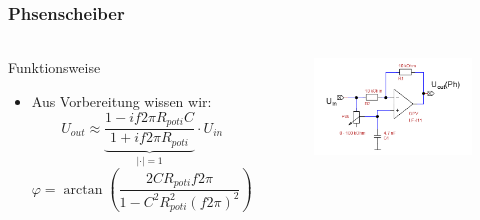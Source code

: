 \begin{frame}
\frametitle{Phsenscheiber}
\framesubtitle{}
    \begin{columns}[c]
        \begin{block}{Funktionsweise}
         \begin{itemize}
            \item Aus Vorbereitung wissen wir:
            \begin{equation*}
                U_{out} \approx \underbrace{\frac{1-if2\pi R_{poti}
                C}{1+if2\pi R_{poti}}}_{|\cdot| = 1}
                \cdot U_{in} 
            \end{equation*}
            \begin{equation*}
                \varphi = \arctan \left( \frac{2C R_{poti} f 2\pi}{1 - C^2
                R_{poti}^2 (f2\pi)^2} \right)
            \end{equation*}
         \end{itemize}
        \end{block}
         \begin{figure}[H]
         \begin{center}
                 \includegraphics[scale=0.3]{./img/schaltung/Phasenschieber.png}
         \end{center}
         \end{figure}
    \end{columns}
\end{frame}

